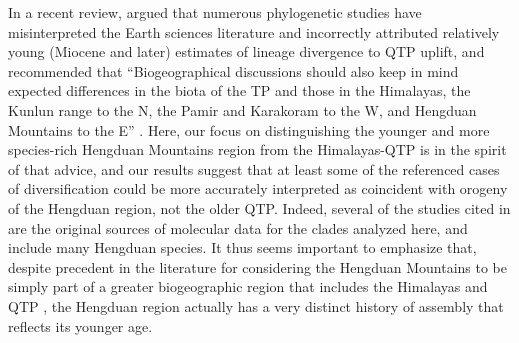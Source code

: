 In a recent review, \citet{Renner2016} argued that numerous phylogenetic studies have misinterpreted the Earth sciences literature and incorrectly attributed relatively young (Miocene and later) estimates of lineage divergence to QTP uplift, and recommended that ``Biogeographical discussions should also keep in mind expected differences in the biota of the TP and those in the Himalayas, the Kunlun range to the N, the Pamir and Karakoram to the W, and Hengduan Mountains to the E'' \citep[][p.~7]{Renner2016}. Here, our focus on distinguishing the younger and more species-rich Hengduan Mountains region from the Himalayas-QTP is in the spirit of that advice, and our results suggest that at least some of the referenced cases of diversification could be more accurately interpreted as coincident with orogeny of the Hengduan region, not the older QTP. Indeed, several of the studies cited in \citet{Renner2016} are the original sources of molecular data for the clades analyzed here, and include many Hengduan species. It thus seems important to emphasize that, despite precedent in the literature for considering the Hengduan Mountains to be simply part of a greater biogeographic region that includes the Himalayas and QTP \citep[e.g.][]{ZhangJ2014,Nie2013,GaoY2013,Matuszak2016}, the Hengduan region actually has a very distinct history of assembly that reflects its younger age.




